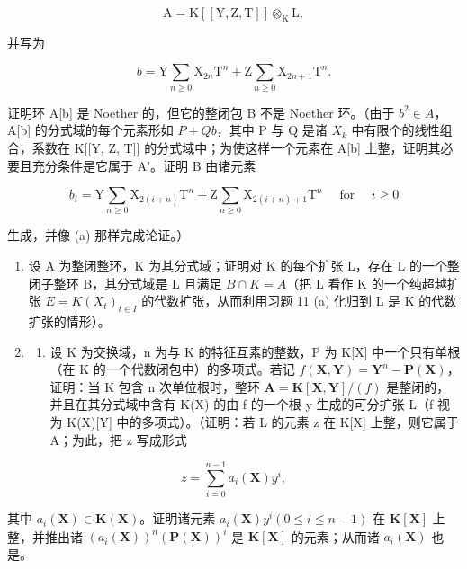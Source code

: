 \[
\mathrm{A} = \mathrm{K} [ [ \mathrm{Y}, \mathrm{Z}, \mathrm{T} ] ] \otimes_ {\mathrm{K}} \mathrm{L},
\]

并写为

\[
b = \mathrm{Y} \sum_ {n \geqslant 0} \mathrm{X} _ {2 n} \mathrm{T} ^ {n} + \mathrm{Z} \sum_ {n \geqslant 0} \mathrm{X} _ {2 n + 1} \mathrm{T} ^ {n}.
\]

证明环 A{[}b{]} 是 Noether 的，但它的整闭包 B 不是 Noether 环。（由于 \(b^{2} \in A\)，A{[}b{]} 的分式域的每个元素形如 \(P + Qb\)，其中 P 与 Q 是诸 \(X_{k}\) 中有限个的线性组合，系数在 K{[}{[}Y, Z, T{]}{]} 的分式域中；为使这样一个元素在 A{[}b{]} 上整，证明其必要且充分条件是它属于 A'。证明 B 由诸元素

\[
b _ {i} = \mathrm{Y} \sum_ {n \geqslant 0} \mathrm{X} _ {2 (i + n)} \mathrm{T} ^ {n} + \mathrm{Z} \sum_ {n \geqslant 0} \mathrm{X} _ {2 (i + n) + 1} \mathrm{T} ^ {n} \quad \text { for } \quad i \geqslant 0
\]

生成，并像 (a) 那样完成论证。）

\begin{enumerate}
\def\labelenumi{\arabic{enumi}.}
\setcounter{enumi}{21}
\item
  设 A 为整闭整环，K 为其分式域；证明对 K 的每个扩张 L，存在 L 的一个整闭子整环 B，其分式域是 L 且满足 \(B \cap K = A\)（把 L 看作 K 的一个纯超越扩张 \(E = K(X_t)_{t \in I}\) 的代数扩张，从而利用习题 11 (a) 化归到 L 是 K 的代数扩张的情形）。
\item
  \begin{enumerate}
  \def\labelenumii{(\alph{enumii})}
  \tightlist
  \item
    设 K 为交换域，n 为与 K 的特征互素的整数，P 为 K{[}X{]} 中一个只有单根（在 K 的一个代数闭包中）的多项式。若记 \(f(\mathbf{X}, \mathbf{Y}) = \mathbf{Y}^{n} - \mathbf{P}(\mathbf{X})\)，证明：当 K 包含 n 次单位根时，整环 \(\mathbf{A} = \mathbf{K}[\mathbf{X}, \mathbf{Y}] / (f)\) 是整闭的，并且在其分式域中含有 K(X) 的由 f 的一个根 y 生成的可分扩张 L（f 视为 K(X){[}Y{]} 中的多项式）。（证明：若 L 的元素 z 在 K{[}X{]} 上整，则它属于 A；为此，把 z 写成形式
  \end{enumerate}
\end{enumerate}

\[
z = \sum_ {i = 0} ^ {n - 1} a _ {i} (\mathbf {X}) y ^ {i},
\]

其中 \(a_{i}(\mathbf{X}) \in \mathbf{K}(\mathbf{X})\)。证明诸元素 \(a_{i}(\mathbf{X})y^{i} (0 \leqslant i \leqslant n - 1)\) 在 \(\mathbf{K}[\mathbf{X}]\) 上整，并推出诸 \((a_{i}(\mathbf{X}))^{n}(\mathbf{P}(\mathbf{X}))^{i}\) 是 \(\mathbf{K}[\mathbf{X}]\) 的元素；从而诸 \(a_{i}(\mathbf{X})\) 也是。

